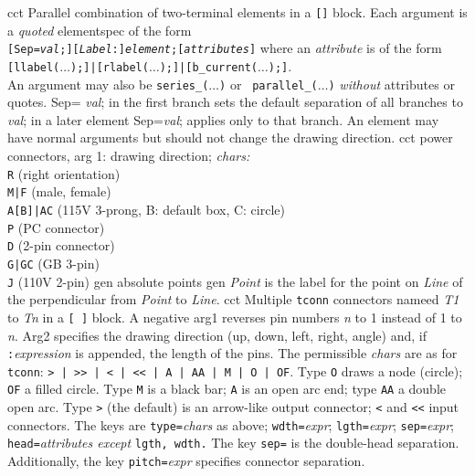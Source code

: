 %
  {cct}%
  { Parallel combination of two-terminal elements in a {\tt []} block.
    Each argument is a {\em quoted} elementspec of the form\\
    {\tt[Sep={\sl val};][{\sl Label}:]{\sl element};[{\sl attributes}]} where
    an {\sl attribute} is of the form\\
    {\tt[llabel($\ldots$);]|[rlabel($\ldots$);]|[b\_current($\ldots$);]}.\\
    An argument may also be {\tt series\_($\ldots$)} or {\tt
    parallel\_($\ldots$)} {\em without} attributes or quotes.  Sep={\sl
    val}; in the first branch sets the default separation of all branches
    to {\sl val}; in a later element Sep={\sl val}; applies only to
    that branch.  An element may have normal arguments but should not
    change the drawing direction.
   }%
%
  {cct}%
  {power connectors, arg 1: drawing direction; {\sl chars:}\\
   {\tt R} (right orientation)\\
   {\tt M|F} (male, female)\\
   {\tt A[B]|AC} (115V 3-prong, B: default box, C: circle)\\
   {\tt P} (PC connector)\\
   {\tt D} (2-pin connector)\\
   {\tt G|GC} (GB 3-pin)\\
   {\tt J} (110V 2-pin)
    }%
%
  {gen}%
  {absolute points}%
%
  {gen}%
  {{\sl Point} is the label for the point on {\sl Line} of the
  perpendicular
   from {\sl Point} to {\sl Line}.}%
%
  {cct}%
  { Multiple {\tt tconn} connectors nameed {\sl T1} to {\sl Tn} in a {\tt [ ]}
    block.
    A negative arg1 reverses pin numbers {\sl n} to 1 instead of 1 to {\sl n}.
   Arg2 specifies the drawing direction (up, down, left, right, angle) and,
   if {\tt :}{\sl expression} is appended, the length of the pins. 
   The permissible {\sl chars} are as for {\tt tconn}:
   {\tt > | >{}> | < | <{}< | A | AA | M | O | OF}.
   Type {\tt O} draws a node (circle); {\tt OF} a filled circle.
   Type {\tt M} is a black bar; {\tt A} is an open arc end; type {\tt AA}
   a double open arc.  Type {\tt >} (the default) is an arrow-like output
   connector; {\tt <} and {\tt <{}<} input connectors.
   The keys are {\tt type=}{\sl chars} as above;
   {\tt wdth=}{\sl expr}; {\tt lgth=}{\sl expr}; {\tt sep=}{\sl expr};
   {\tt head=}{\sl attributes except} {\tt lgth, wdth.}
   The key {\tt sep=} is the double-head separation.
   Additionally, the key {\tt pitch=}{\sl expr} specifies connector
   separation.
    }%
